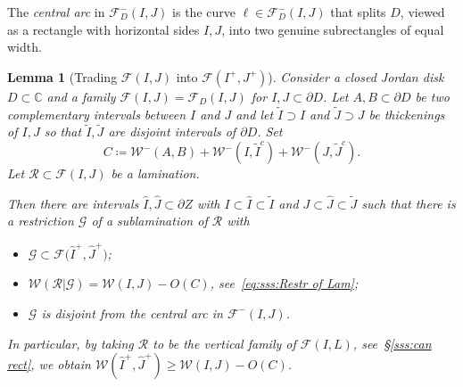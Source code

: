 \documentclass{amsart}
\newcommand{\1}{{\mathbb 1 }}
\newcommand{\reminder}[1]{\textsl{$\lhd\rhd$#1$\lhd\rhd$}\marginpar{$\lhd\rhd\lhd\rhd\lhd\rhd$}}
\newcommand{\FamG}{{\mathcal G}}
\newcommand{\Fam}{{\mathcal F}}
\newcommand{\Width}{{\mathcal W}}
\newcommand\RR{\mathcal{R}}
\newcommand{\wJ}{{\widehat J}}
\newcommand{\wI}{{\widehat I}}
\newcommand{\C}{\mathbb{C}}
\newtheorem{lem}[thm]{Lemma}
\theoremstyle{remark}
\numberwithin{equation}{section}
\theoremstyle{definition}
\begin{document}
The \emph{central arc} in $\Fam^-_D(I,J)$ is the curve $\ell\in \Fam^-_D(I,J)$ that splits $D$, viewed as a rectangle with horizontal sides $I,J$, into two genuine subrectangles of equal width. 


\begin{lem}[Trading $\Fam(I,J)$ into $\Fam(I^+,J^+)$]
\label{lmm:W into W(I+,J+)}
Consider a closed Jordan disk $D\subset \C$ and a family $\Fam(I,J)=\Fam_D (I,J)$ for $I,J\subset \partial D$.  Let $A,B\subset \partial D$ be two complementary intervals between $I$ and $J$ and let $\widetilde I\supset I$ and $  \widetilde J\supset J$ be thickenings of $I,J$ so that $\widetilde I, \widetilde J$ are disjoint intervals of $\partial D$. Set 
\[ C\coloneqq \Width^-(A,B) +\Width^-(I,\widetilde I ^c )+\Width^-(J,\widetilde J ^c) .\]
Let $\RR\subset \Fam(I,J)$ be a lamination. 


Then there are intervals $\wI, \wJ \subset \partial Z$ with $I\subset \wI\subset \widetilde I$ and $J\subset \wJ\subset \widetilde J$ such that there is a restriction $\FamG$ of a sublamination of $\RR$ with
\begin{itemize}
\item  $\FamG\subset \Fam\big(\wI^+, \wJ^+\big)$;
\item $\Width(\RR|\FamG)=\Width(I,J) - O(C)$, see~\eqref{eq:sss:Restr of Lam};
\item $\FamG$ is disjoint from the central arc in $\Fam^-(I,J)$.
\end{itemize}


 In particular, by taking $\RR$ to be the vertical family of  $\Fam(I,L)$, see~\S\ref{sss:can rect}, we obtain $\Width(\wI^+, \wJ^+)\ge\Width(I,J) - O(C)$. 
\end{lem}
\end{document}
